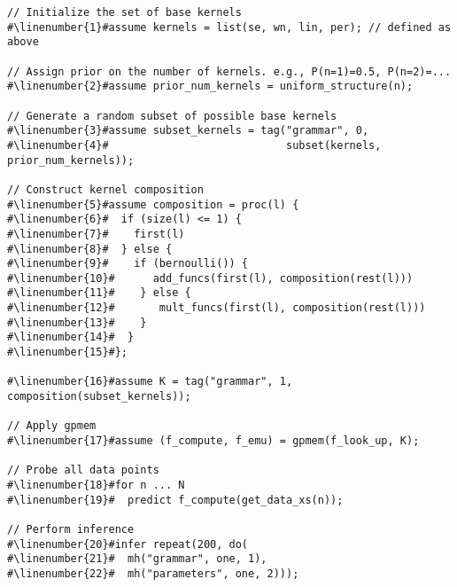 \begin{mdframed}
\begin{minipage}{\linewidth}
\small
\belowcaptionskip=-10pt
\begin{lstlisting}[mathescape,label=alg:structureVent,basicstyle=\selectfont\ttfamily,numbers=none,caption={Structure
Learning},escapechar=\#]
// Initialize the set of base kernels 
#\linenumber{1}#assume kernels = list(se, wn, lin, per); // defined as above

// Assign prior on the number of kernels. e.g., P(n=1)=0.5, P(n=2)=...
#\linenumber{2}#assume prior_num_kernels = uniform_structure(n);

// Generate a random subset of possible base kernels
#\linenumber{3}#assume subset_kernels = tag("grammar", 0,
#\linenumber{4}#                            subset(kernels, prior_num_kernels));

// Construct kernel composition
#\linenumber{5}#assume composition = proc(l) {
#\linenumber{6}#  if (size(l) <= 1) {
#\linenumber{7}#    first(l)
#\linenumber{8}#  } else {
#\linenumber{9}#    if (bernoulli()) {
#\linenumber{10}#      add_funcs(first(l), composition(rest(l)))
#\linenumber{11}#    } else {
#\linenumber{12}#       mult_funcs(first(l), composition(rest(l)))
#\linenumber{13}#    }
#\linenumber{14}#  }
#\linenumber{15}#};

#\linenumber{16}#assume K = tag("grammar", 1, composition(subset_kernels));

// Apply gpmem 
#\linenumber{17}#assume (f_compute, f_emu) = gpmem(f_look_up, K);

// Probe all data points
#\linenumber{18}#for n ... N
#\linenumber{19}#  predict f_compute(get_data_xs(n));

// Perform inference
#\linenumber{20}#infer repeat(200, do(
#\linenumber{21}#  mh("grammar", one, 1),
#\linenumber{22}#  mh("parameters", one, 2)));
\end{lstlisting}

\end{minipage}
\end{mdframed}
